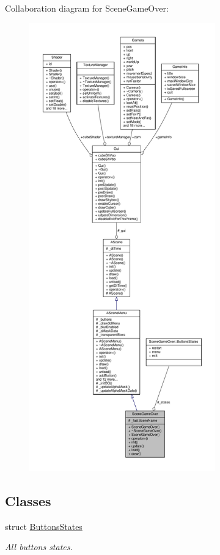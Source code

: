 Collaboration diagram for Scene\+Game\+Over\+:
\nopagebreak
\begin{figure}[H]
\begin{center}
\leavevmode
\includegraphics[height=550pt]{class_scene_game_over__coll__graph}
\end{center}
\end{figure}
\subsection*{Classes}
\begin{DoxyCompactItemize}
\item 
struct \hyperlink{struct_scene_game_over_1_1_buttons_states}{Buttons\+States}
\begin{DoxyCompactList}\small\item\em All buttons states. \end{DoxyCompactList}\end{DoxyCompactItemize}
